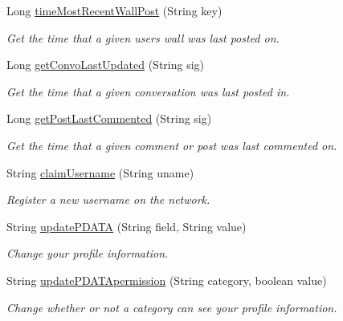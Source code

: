 \begin{DoxyCompactItemize}
Long \hyperlink{classballmerpeak_1_1turtlenet_1_1server_1_1TurtlenetImpl_a0555da815949426da19e4aa94798fb77}{time\-Most\-Recent\-Wall\-Post} (String key)
\begin{DoxyCompactList}\small\item\em Get the time that a given users wall was last posted on. \end{DoxyCompactList}\item 
Long \hyperlink{classballmerpeak_1_1turtlenet_1_1server_1_1TurtlenetImpl_a9215bd0cbe7b6c5e925867c7a8ab4be3}{get\-Convo\-Last\-Updated} (String sig)
\begin{DoxyCompactList}\small\item\em Get the time that a given conversation was last posted in. \end{DoxyCompactList}\item 
Long \hyperlink{classballmerpeak_1_1turtlenet_1_1server_1_1TurtlenetImpl_ac98d21dc081755ae7ec66220a0287551}{get\-Post\-Last\-Commented} (String sig)
\begin{DoxyCompactList}\small\item\em Get the time that a given comment or post was last commented on. \end{DoxyCompactList}\item 
String \hyperlink{classballmerpeak_1_1turtlenet_1_1server_1_1TurtlenetImpl_a614a4363b79719b16cc10d9871807326}{claim\-Username} (String uname)
\begin{DoxyCompactList}\small\item\em Register a new username on the network. \end{DoxyCompactList}\item 
String \hyperlink{classballmerpeak_1_1turtlenet_1_1server_1_1TurtlenetImpl_a6498adb8c069a9778b241dde8bad667a}{update\-P\-D\-A\-T\-A} (String field, String value)
\begin{DoxyCompactList}\small\item\em Change your profile information. \end{DoxyCompactList}\item 
String \hyperlink{classballmerpeak_1_1turtlenet_1_1server_1_1TurtlenetImpl_af50db109b6ae5adde4ac18a324a4aa66}{update\-P\-D\-A\-T\-Apermission} (String category, boolean value)
\begin{DoxyCompactList}\small\item\em Change whether or not a category can see your profile information. \end{DoxyCompactList}\item 

\end{DoxyCompactItemize}
